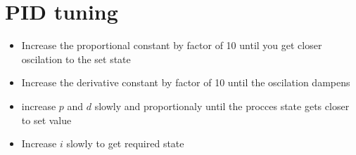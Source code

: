 \documentclass[a4paper]{article}
\begin{document}
\section{PID tuning }
\begin{itemize}
        \item Increase the proportional constant by factor of 10 until you get closer oscilation to the set state
        \item Increase the derivative constant by factor of 10 until the oscilation dampens
        \item increase $p$ and  $d$ slowly and proportionaly until the procces state gets closer to set value
        \item Increase $i$ slowly to get required state 
\end{itemize}

\end{document}
